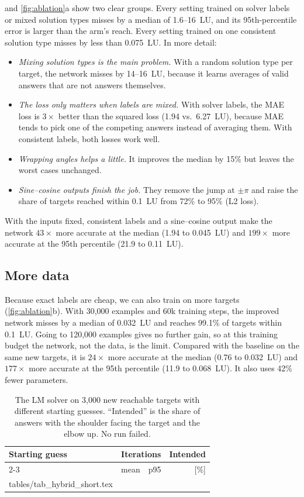 \documentclass[conference]{IEEEtran}
\makeatletter
\newcommand{\tabinput}[1]{\@@input #1 }
\makeatother
\begin{document}
 and \cref{fig:ablation}a show two clear groups. Every setting trained on solver labels or mixed solution types misses by a median of 1.6--16~LU, and its 95th-percentile error is larger than the arm's reach. Every setting trained on one consistent solution type misses by less than 0.075~LU. In more detail:
\begin{itemize}
\item \emph{Mixing solution types is the main problem.} With a random solution type per target, the network misses by 14--16~LU, because it learns averages of valid answers that are not answers themselves.
\item \emph{The loss only matters when labels are mixed.} With solver labels, the MAE loss is $3\times$ better than the squared loss (1.94 vs.\ 6.27~LU), because MAE tends to pick one of the competing answers instead of averaging them. With consistent labels, both losses work well.
\item \emph{Wrapping angles helps a little.} It improves the median by 15\% but leaves the worst cases unchanged.
\item \emph{Sine--cosine outputs finish the job.} They remove the jump at $\pm\pi$ and raise the share of targets reached within 0.1~LU from 72\% to 95\% (L2 loss).
\end{itemize}
With the inputs fixed, consistent labels and a sine--cosine output make the network $43\times$ more accurate at the median (1.94 to 0.045~LU) and $199\times$ more accurate at the 95th percentile (21.9 to 0.11~LU).

\subsection{More data}
Because exact labels are cheap, we can also train on more targets (\cref{fig:ablation}b). With 30{,}000 examples and 60k training steps, the improved network misses by a median of 0.032~LU and reaches 99.1\% of targets within 0.1~LU. Going to 120{,}000 examples gives no further gain, so at this training budget the network, not the data, is the limit. Compared with the baseline on the same new targets, it is $24\times$ more accurate at the median (0.76 to 0.032~LU) and $177\times$ more accurate at the 95th percentile (11.9 to 0.068~LU). It also uses 42\% fewer parameters.

\begin{table}[t]
\centering
\small
\caption{The LM solver on 3{,}000 new reachable targets with different starting guesses. ``Intended'' is the share of answers with the shoulder facing the target and the elbow up. No run failed.}
\label{tab:hybrid}
\begin{tabular}{lrrr}
\toprule
Starting guess & \multicolumn{2}{c}{Iterations} & Intended \\
\cmidrule(lr){2-3}
 & mean & p95 & [\%] \\
\midrule
\tabinput{tables/tab_hybrid_short.tex}
\bottomrule
\end{tabular}
\end{table}
\end{document}
